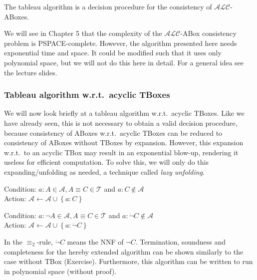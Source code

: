 \begin{theorem}
	The tableau algorithm is a decision procedure for the consistency of  $\mathcal{ALC}$-ABoxes.
\end{theorem}
We will see in Chapter 5 that the complexity of the $\mathcal{ALC}$-ABox consistency problem is \textsc{PSPACE}-complete.
However, the algorithm presented here needs exponential time and space.
It could be modified such that it uses only polynomial space, but we will not do this here in detail.
For a general idea see the lecture slides.

\subsubsection{Tableau algorithm w.r.t.\ acyclic TBoxes}
We will now look briefly at a tableau algorithm w.r.t.\ acyclic TBoxes.
Like we have already seen, this is not necessary to obtain a valid decision procedure,
because consistency of ABoxes w.r.t.\ acyclic TBoxes can be reduced to consistency of ABoxes without TBoxes by expansion.
However, this expansion w.r.t.\ to an acyclic TBox may result in an exponential blow-up, rendering it useless for efficient computation.
To solve this, we will only do this expanding/unfolding as needed, a technique called \textit{lazy unfolding}.
\begin{mdframed}[frametitle= The $ \equiv_1$-rule]
	Condition: $a : A \in \mathcal{A}, A  \equiv C \in \mathcal{T}$ and $a:C \notin \mathcal{A}$ \\
	Action: $\mathcal{A} \leftarrow \mathcal{A} \cup \left\{ a:C \right\}$
\end{mdframed}
\begin{mdframed}[frametitle= The $ \equiv_2$-rule, nobreak = true]
	Condition: $a : \neg A \in \mathcal{A}, A \equiv C \in \mathcal{T}$ and $a : \dot{\neg} C \notin \mathcal{A}$ \\
	Action: $\mathcal{A} \leftarrow \mathcal{A} \cup \left\{ a: \dot{\neg}C \right\}$
\end{mdframed}
In the $\equiv_2$-rule, $\dot{\neg}C$ means the NNF of $\neg C$.
Termination, soundness and completeness for the hereby extended algorithm can be shown similarly to the case without TBox (Exercise).
Furthermore, this algorithm can be written to run in polynomial space (without proof).

